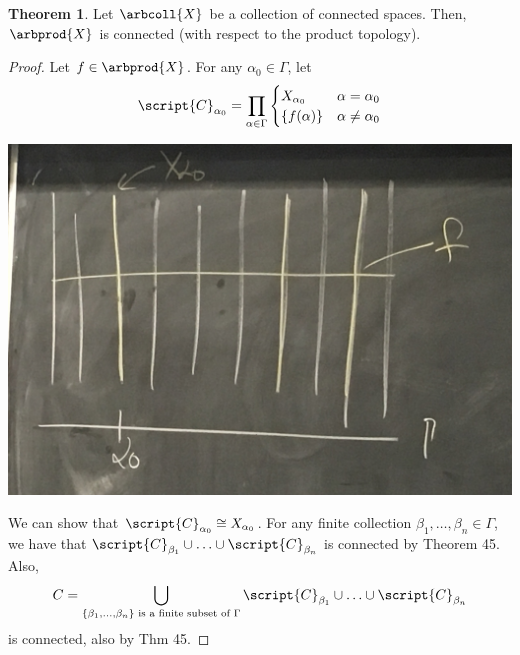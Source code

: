 \documentclass[a5paper]{article}
\theoremstyle{definition}%
\newtheorem{theorem}{Theorem}
\numberwithin{exercise}{section}
\theoremstyle{remark}%
\begin{document}
\begin{highlight}
\begin{theorem}
Let $\arbcoll{X}$ be a collection of connected spaces. Then, $\arbprod{X}$ is connected (with respect to the product topology). 
\end{theorem}
\end{highlight}
\begin{proof}
Let $f\in\arbprod{X}$. For any $\alpha_0\in\Gamma$, let 
\[\script{C}_{\alpha_0}=\prod_{\alpha\in\Gamma}
\begin{cases}
X_{\alpha_0} &  \alpha=\alpha_0\\
\{f(\alpha)\} &   \alpha\neq\alpha_0\\
\end{cases}\]
\begin{center}
\includegraphics[scale=.08]{images/thm54_1}
\end{center}
We can show that $\script{C}_{\alpha_0} \cong X_{\alpha_0}$. For any finite collection $\beta_1, \ldots, \beta_n \in \Gamma$, we have that $\script{C}_{\beta_1} \cup \ldots \cup \script{C}_{\beta_n}$ is connected by Theorem 45.
Also, 
$$C = \bigcup_{\{\beta_1, \ldots, \beta_n\}\text{ is a finite subset of }\Gamma} \script{C}_{\beta_1} \cup \ldots \cup \script{C}_{\beta_n}$$
is connected, also by Thm 45. 


\end{proof}
\end{document}
